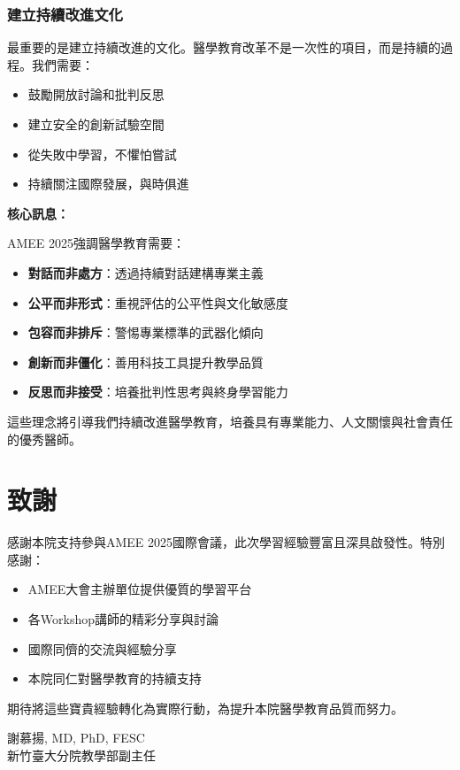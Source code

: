 \documentclass[12pt,a4paper]{article}
\newcommand{\mydate}{\DTMtoday}
\begin{document}
\subsubsection{建立持續改進文化}

最重要的是建立持續改進的文化。醫學教育改革不是一次性的項目，而是持續的過程。我們需要：
\begin{itemize}[nosep]
    \item 鼓勵開放討論和批判反思
    \item 建立安全的創新試驗空間
    \item 從失敗中學習，不懼怕嘗試
    \item 持續關注國際發展，與時俱進
\end{itemize}

\begin{importantbox}
\textbf{核心訊息：}

AMEE 2025強調醫學教育需要：
\begin{itemize}[nosep]
    \item \textbf{對話而非處方}：透過持續對話建構專業主義
    \item \textbf{公平而非形式}：重視評估的公平性與文化敏感度
    \item \textbf{包容而非排斥}：警惕專業標準的武器化傾向
    \item \textbf{創新而非僵化}：善用科技工具提升教學品質
    \item \textbf{反思而非接受}：培養批判性思考與終身學習能力
\end{itemize}

這些理念將引導我們持續改進醫學教育，培養具有專業能力、人文關懷與社會責任的優秀醫師。
\end{importantbox}

\section*{致謝}

感謝本院支持參與AMEE 2025國際會議，此次學習經驗豐富且深具啟發性。特別感謝：
\begin{itemize}[nosep]
    \item AMEE大會主辦單位提供優質的學習平台
    \item 各Workshop講師的精彩分享與討論
    \item 國際同儕的交流與經驗分享
    \item 本院同仁對醫學教育的持續支持
\end{itemize}

期待將這些寶貴經驗轉化為實際行動，為提升本院醫學教育品質而努力。

\vspace{1cm}
\begin{flushright}
謝慕揚, MD, PhD, FESC\\
新竹臺大分院教學部副主任\\
\mydate
\end{flushright}
\end{document}
